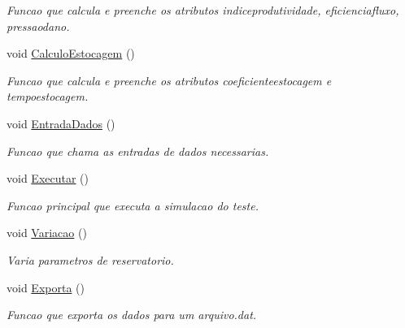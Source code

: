 \begin{DoxyCompactItemize}
\begin{DoxyCompactList}\small\item\em Funcao que calcula e preenche os atributos indiceprodutividade, eficienciafluxo, pressaodano. \end{DoxyCompactList}\item 
\hypertarget{classCSimuladorAnaliseTestePressao_a89bd4fd7284643a2b36b219ba250b8da}{void \hyperlink{classCSimuladorAnaliseTestePressao_a89bd4fd7284643a2b36b219ba250b8da}{Calculo\-Estocagem} ()}\label{classCSimuladorAnaliseTestePressao_a89bd4fd7284643a2b36b219ba250b8da}

\begin{DoxyCompactList}\small\item\em Funcao que calcula e preenche os atributos coeficienteestocagem e tempoestocagem. \end{DoxyCompactList}\item 
\hypertarget{classCSimuladorAnaliseTestePressao_ac8a12e3680c2d53c47083d27940ecf4c}{void \hyperlink{classCSimuladorAnaliseTestePressao_ac8a12e3680c2d53c47083d27940ecf4c}{Entrada\-Dados} ()}\label{classCSimuladorAnaliseTestePressao_ac8a12e3680c2d53c47083d27940ecf4c}

\begin{DoxyCompactList}\small\item\em Funcao que chama as entradas de dados necessarias. \end{DoxyCompactList}\item 
\hypertarget{classCSimuladorAnaliseTestePressao_a1a3fc00da83a0a1e05b1f7d94dd600ba}{void \hyperlink{classCSimuladorAnaliseTestePressao_a1a3fc00da83a0a1e05b1f7d94dd600ba}{Executar} ()}\label{classCSimuladorAnaliseTestePressao_a1a3fc00da83a0a1e05b1f7d94dd600ba}

\begin{DoxyCompactList}\small\item\em Funcao principal que executa a simulacao do teste. \end{DoxyCompactList}\item 
void \hyperlink{classCSimuladorAnaliseTestePressao_a2069ce0bab92d9b21413a713da2a090f}{Variacao} ()
\begin{DoxyCompactList}\small\item\em Varia parametros de reservatorio. \end{DoxyCompactList}\item 
void \hyperlink{classCSimuladorAnaliseTestePressao_aa88d01ae70a4dcd4280e78101da4f3c4}{Exporta} ()
\begin{DoxyCompactList}\small\item\em Funcao que exporta os dados para um arquivo.\-dat. \end{DoxyCompactList}\end{DoxyCompactItemize}
